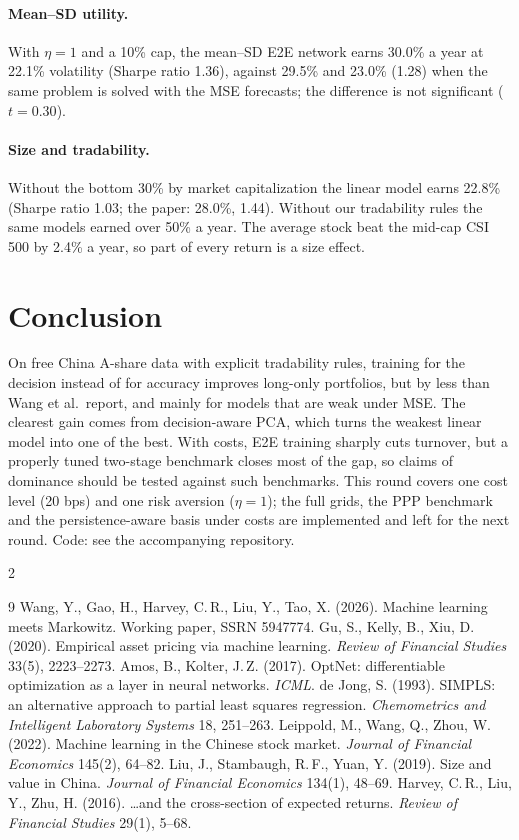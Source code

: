 \documentclass[10pt,a4paper]{article}
\begin{document}
\paragraph{Mean--SD utility.} With $\eta=1$ and a 10\% cap, the mean--SD E2E network earns 30.0\% a year at 22.1\%
volatility (Sharpe ratio 1.36), against 29.5\% and 23.0\% (1.28) when the same problem is solved with the MSE
forecasts; the difference is not significant ($t=0.30$).

\paragraph{Size and tradability.} Without the bottom 30\% by market capitalization the linear model earns 22.8\%
(Sharpe ratio 1.03; the paper: 28.0\%, 1.44). Without our tradability rules the same models earned over 50\% a
year. The average stock beat the mid-cap CSI 500 by 2.4\% a year, so part of every return is a size effect.

\section{Conclusion}
On free China A-share data with explicit tradability rules, training for the decision instead of for accuracy
improves long-only portfolios, but by less than Wang et al.\ report, and mainly for models that are weak under
MSE. The clearest gain comes from decision-aware PCA, which turns the weakest linear model into one of the best.
With costs, E2E training sharply cuts turnover, but a properly tuned two-stage benchmark closes most of the gap,
so claims of dominance should be tested against such benchmarks. This round covers one cost level (20 bps) and
one risk aversion ($\eta=1$); the full grids, the PPP benchmark and the persistence-aware basis under costs are
implemented and left for the next round. Code: see the accompanying repository.

\begin{multicols}{2}
\begin{thebibliography}{9}\scriptsize\setlength{\itemsep}{0pt}\setlength{\parskip}{0pt}
 Wang, Y., Gao, H., Harvey, C.\,R., Liu, Y., Tao, X. (2026). Machine learning meets Markowitz. Working paper, SSRN 5947774.
 Gu, S., Kelly, B., Xiu, D. (2020). Empirical asset pricing via machine learning. \emph{Review of Financial Studies} 33(5), 2223--2273.
 Amos, B., Kolter, J.\,Z. (2017). OptNet: differentiable optimization as a layer in neural networks. \emph{ICML}.
 de Jong, S. (1993). SIMPLS: an alternative approach to partial least squares regression. \emph{Chemometrics and Intelligent Laboratory Systems} 18, 251--263.
 Leippold, M., Wang, Q., Zhou, W. (2022). Machine learning in the Chinese stock market. \emph{Journal of Financial Economics} 145(2), 64--82.
 Liu, J., Stambaugh, R.\,F., Yuan, Y. (2019). Size and value in China. \emph{Journal of Financial Economics} 134(1), 48--69.
 Harvey, C.\,R., Liu, Y., Zhu, H. (2016). \ldots and the cross-section of expected returns. \emph{Review of Financial Studies} 29(1), 5--68.
\end{thebibliography}
\end{multicols}
\end{document}
